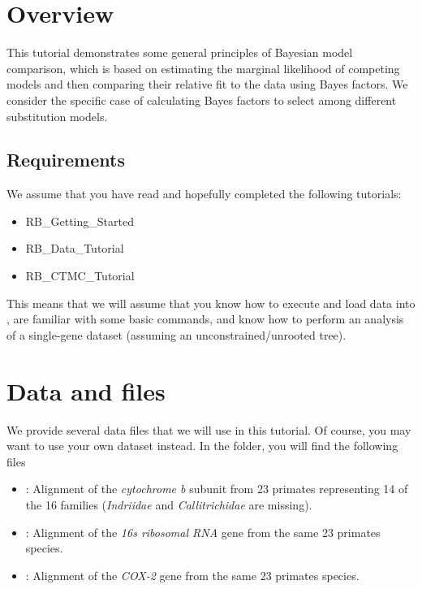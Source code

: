 \section{Overview}


This tutorial demonstrates some general principles of Bayesian model comparison, which is based on estimating the marginal likelihood of competing models and then comparing their relative fit to the data using Bayes factors.
We consider the specific case of calculating Bayes factors to select among different substitution models.

\subsection{Requirements}
We assume that you have read and hopefully completed the following tutorials:
\begin{itemize}
\item RB\_Getting\_Started
\item RB\_Data\_Tutorial
\item RB\_CTMC\_Tutorial
\end{itemize}
This means that we will assume that you know how to execute and load data into \RevBayes, are familiar with some basic commands, and know how to perform an analysis of a single-gene dataset (assuming an unconstrained/unrooted tree).



\section{Data and files}

We provide several data files that we will use in this tutorial.
Of course, you may want to use your own dataset instead.
In the  folder, you will find the following files
\begin{itemize}
\item
{}: Alignment of the \textit{cytochrome b} subunit from 23 primates representing 14 of the 16 families (\textit{Indriidae} and \textit{Callitrichidae} are missing).
\item
{}: Alignment of the \textit{16s ribosomal RNA} gene from the same 23 primates species.
\item
{}: Alignment of the \textit{COX-2} gene from the same 23 primates species.
\end{itemize}



